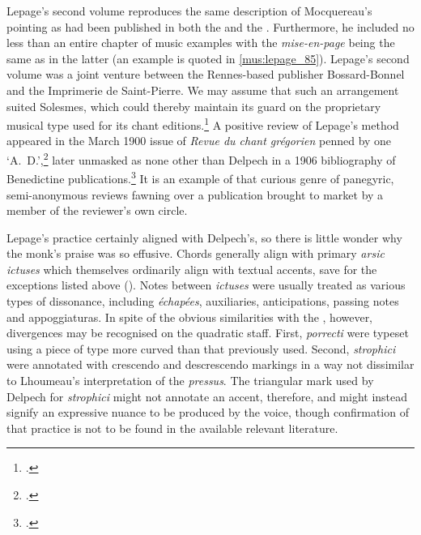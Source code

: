 Lepage's second volume reproduces the same description of Mocquereau's pointing as had been published in both the \tsg{} and the \ldo{}.
Furthermore, he included no less than an entire chapter of music examples with the \emph{mise-en-page} being the same as in the latter (an example is quoted in \cref{mus:lepage_85}).
Lepage's second volume was a joint venture between the Rennes-based publisher Bossard-Bonnel and the Imprimerie de Saint-Pierre.
We may assume that such an arrangement suited Solesmes, which could thereby maintain its guard on the proprietary musical type used for its chant editions.\footcite[85]{LepageTraiteaccompagnementplainchant1900}
A positive review of Lepage's method appeared in the March 1900 issue of \emph{Revue du chant grégorien} penned by one `A.~D.',\footcite[136]{D[elpech]ReviewLepageTraite1900} later unmasked as none other than Delpech in a 1906 bibliography of Benedictine publications.\footcite[41]{BibliographieBenedictinscongregation1906}
It is an example of that curious genre of panegyric, semi-anonymous reviews fawning over a publication brought to market by a member of the reviewer's own circle.

Lepage's practice certainly aligned with Delpech's, so there is little wonder why the monk's praise was so effusive.
Chords generally align with primary \emph{arsic} \emph{ictuses} which themselves ordinarily align with textual accents, save for the exceptions listed above ().
Notes between \emph{ictuses} were usually treated as various types of dissonance, including \emph{échapées}, auxiliaries, anticipations, passing notes and appoggiaturas.
In spite of the obvious similarities with the \ldo{}, however, divergences may be recognised on the quadratic staff.
First, \emph{porrecti} were typeset using a piece of type more curved than that previously used.
Second, \emph{strophici} were annotated with crescendo and descrescendo markings in a way not dissimilar to Lhoumeau's interpretation of the \emph{pressus}.
The triangular mark used by Delpech for \emph{strophici} might not annotate an accent, therefore, and might instead signify an expressive nuance to be produced by the voice, though confirmation of that practice is not to be found in the available relevant literature.

